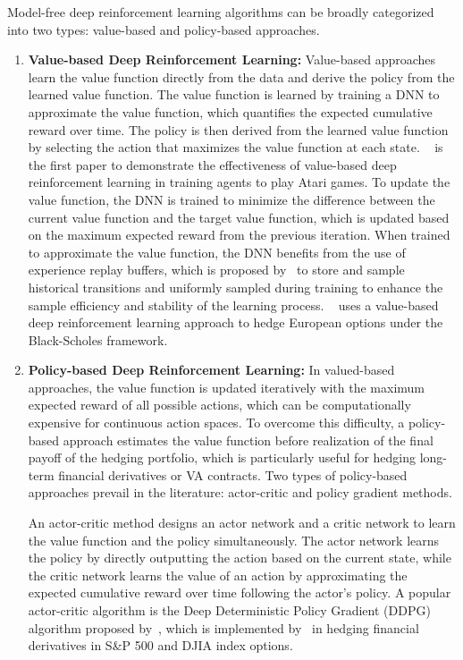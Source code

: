 Model-free deep reinforcement learning algorithms can be broadly categorized into two types: value-based and policy-based approaches.

\begin{enumerate}
    \item \textbf{Value-based Deep Reinforcement Learning:} Value-based approaches learn the value function directly from the data and derive the policy from the learned value function. 
    The value function is learned by training a DNN to approximate the value function, which quantifies the expected cumulative reward over time. 
    The policy is then derived from the learned value function by selecting the action that maximizes the value function at each state. 
    ~\cite{mnih2015human} is the first paper to demonstrate the effectiveness of value-based deep reinforcement learning in training agents to play Atari games.
    To update the value function, the DNN is trained to minimize the difference between the current value function and the target value function, which is updated based on the maximum expected reward from the previous iteration.
    When trained to approximate the value function, the DNN benefits from the use of experience replay buffers, which is proposed by~\cite{lin1992self} to store and sample historical transitions and uniformly sampled during training to enhance the sample efficiency and stability of the learning process.
    ~\cite{kolm2019dynamic} uses a value-based deep reinforcement learning approach to hedge European options under the Black-Scholes framework.

    \item \textbf{Policy-based Deep Reinforcement Learning:}
    In valued-based approaches, the value function is updated iteratively with the maximum expected reward of all possible actions, which can be computationally expensive for continuous action spaces.
    To overcome this difficulty, a policy-based approach estimates the value function before realization of the final payoff of the hedging portfolio, which is particularly useful for hedging long-term financial derivatives or VA contracts.
    Two types of policy-based approaches prevail in the literature: actor-critic and policy gradient methods.

    An actor-critic method designs an actor network and a critic network to learn the value function and the policy simultaneously.
    The actor network learns the policy by directly outputting the action based on the current state, while the critic network learns the value of an action by approximating the expected cumulative reward over time following the actor's policy.
    A popular actor-critic algorithm is the Deep Deterministic Policy Gradient (DDPG) algorithm proposed by~\cite{lillicrap2015continuous}, which is implemented by~\cite{xu2022delta} in hedging financial derivatives in S\&P 500 and DJIA index options.
    

\end{enumerate}
